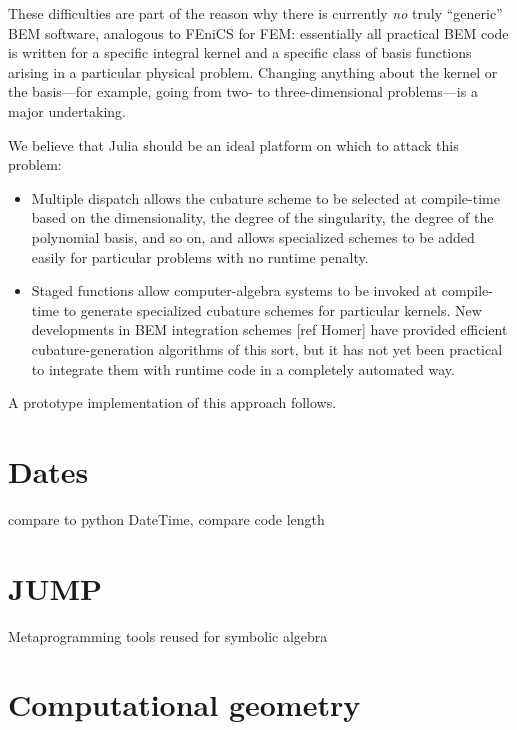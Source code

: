 These difficulties are part of the reason why there is currently \emph{no}
truly ``generic'' BEM software, analogous to FEniCS for FEM: essentially
all practical BEM code is written for a specific integral kernel and
a specific class of basis functions arising in a particular physical problem.
Changing anything about the kernel or the basis---for example, going
from two- to three-dimensional problems---is a major undertaking.

We believe that Julia should be an ideal platform on which to attack this
problem:

\begin{itemize}

\item Multiple dispatch allows the cubature scheme to be selected at compile-time based on the dimensionality, the degree of the singularity, the degree of the polynomial basis, and so on, and allows specialized schemes to be added easily for particular problems with no runtime penalty.

\item Staged functions allow computer-algebra systems to be invoked at
  compile-time to generate specialized cubature schemes for particular
  kernels.  New developments in BEM integration schemes [ref Homer] have
  provided efficient cubature-generation algorithms of this sort, but it
  has not yet been practical to integrate them with runtime code in
  a completely automated way.

\end{itemize}

A prototype implementation of this approach follows.



\section{Dates}

compare to python DateTime, compare code length


\section{JUMP}

Metaprogramming tools reused for symbolic algebra


\section{Computational geometry}


